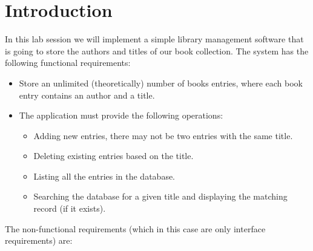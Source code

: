 \documentclass{exercices}
\renewcommand{\|}{\url|}
\begin{document}

\section{Introduction}
In this lab session we will implement a simple library management software that is going to 
store the authors and titles of our book collection. The system has the following functional
requirements:
\begin{itemize}
  \item Store an unlimited (theoretically) number of books entries, where each book entry contains an author and a title.
  \item The application must provide the following operations:
    \begin{itemize}
    \item Adding new entries, there may not be two entries with the same title.
    \item Deleting existing entries based on the title.
    \item Listing all the entries in the database.
    \item Searching the database for a given title and displaying the matching record (if it exists).
    \end{itemize}
\end{itemize}
The non-functional requirements (which in this case are only interface requirements) are:
\end{document}
